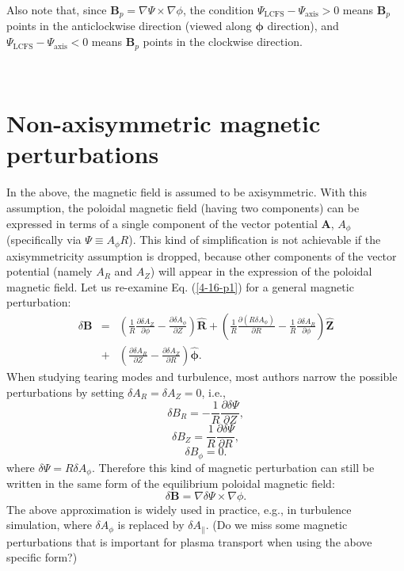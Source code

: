 \documentclass{llncs}
\newcommand{\tmmathbf}[1]{\ensuremath{\boldsymbol{#1}}}
\newcommand{\tmop}[1]{\ensuremath{\operatorname{#1}}}
\begin{document}
Also note that, since $\mathbf{B}_p = \nabla \Psi \times \nabla \phi$, the
condition $\Psi_{\tmop{LCFS}} - \Psi_{\tmop{axis}} > 0$ means $\mathbf{B}_p$
points in the anticlockwise direction (viewed along $\tmmathbf{\phi}$
direction), and $\Psi_{\tmop{LCFS}} - \Psi_{\tmop{axis}} < 0$ means
$\mathbf{B}_p$ points in the clockwise direction.

\

\section{Non-axisymmetric magnetic perturbations}

In the above, the magnetic field is assumed to be axisymmetric. With this
assumption, the poloidal magnetic field (having two components) can be
expressed in terms of a single component of the vector potential $\mathbf{A}$,
$A_{\phi}$ (specifically via $\Psi \equiv A_{\phi} R$). This kind of
simplification is not achievable if the axisymmetricity assumption is dropped,
because other components of the vector potential (namely $A_R$ and $A_Z$) will
appear in the expression of the poloidal magnetic field. Let us re-examine Eq.
(\ref{4-16-p1}) for a general magnetic perturbation:
\begin{eqnarray}
  \delta \mathbf{B} & = & \left( \frac{1}{R} \frac{\partial \delta
  A_Z}{\partial \phi} - \frac{\partial \delta A_{\phi}}{\partial Z} \right)
  \hat{\mathbf{R}} + \left( \frac{1}{R} \frac{\partial (R \delta
  A_{\phi})}{\partial R} - \frac{1}{R} \frac{\partial \delta A_R}{\partial
  \phi} \right) \hat{\mathbf{Z}} \nonumber\\
  & + & \left( \frac{\partial \delta A_R}{\partial Z} - \frac{\partial \delta
  A_Z}{\partial R} \right) \hat{\tmmathbf{\phi}} .  \label{4-16-p1m}
\end{eqnarray}
When studying tearing modes and turbulence, most authors narrow the possible
perturbations by setting $\delta A_R = \delta A_Z = 0$, i.e.,
\begin{equation}
  \delta B_R = - \frac{1}{R} \frac{\partial \delta \Psi}{\partial Z},
\end{equation}
\begin{equation}
  \delta B_Z = \frac{1}{R} \frac{\partial \delta \Psi}{\partial R},
\end{equation}
\begin{equation}
  \delta B_{\phi} = 0.
\end{equation}
where $\delta \Psi = R \delta A_{\phi}$. Therefore this kind of magnetic
perturbation can still be written in the same form of the equilibrium poloidal
magnetic field:
\begin{equation}
  \delta \mathbf{B}= \nabla \delta \Psi \times \nabla \phi .
\end{equation}
The above approximation is widely used in practice, e.g., in turbulence
simulation, where $\delta A_{\phi}$ is replaced by $\delta A_{\parallel}$. (Do
we miss some magnetic perturbations that is important for plasma transport
when using the above specific form?)
\end{document}
